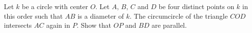 Let $k$ be a circle with center $O$.
Let $A$, $B$, $C$ and $D$ be four distinct points on $k$ in this order such that $AB$ is a diameter of $k$.
The circumcircle of the triangle $COD$ intersects $AC$ again in $P$.
Show that $OP$ and $BD$ are parallel.
